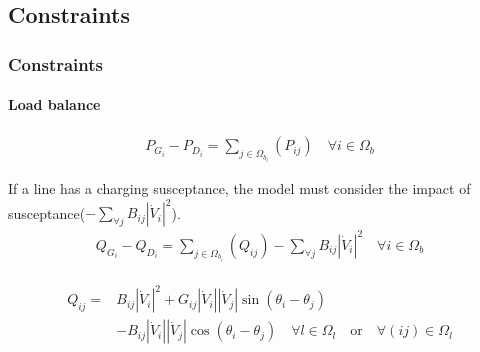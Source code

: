 \documentclass[
	11pt, %
	aspectratio=169, %
]{beamer}
\begin{document}

\subsection{Constraints}

\begin{frame}
	\frametitle{Constraints}
	\label{frame:constraints}
	\framesubtitle{Load balance} %

	\begin{align}
	\label{eq:cons_load_bal_P}
		P_{G_{i}} - P_{D_{i}} = \sum_{j \in \Omega_{b_{i}}}(P_{ij})  \quad \forall i \in \Omega_{b}
	\end{align}

	If a line has a charging susceptance, the model must consider the impact of susceptance($-\sum_{\forall j }B_{ij} \left\lvert \dot{V}_{i}\right\rvert^{2}$).
	\begin{align}
	\label{eq:cons_load_bal_Q}
		Q_{G_{i}} - Q_{D_{i}} = \sum_{j \in \Omega_{b_{i}}}(Q_{ij}) - \sum_{\forall j }B_{ij} \left\lvert \dot{V}_{i}\right\rvert^{2}  \quad \forall i \in \Omega_{b}
	\end{align}

	\begin{align}
	\label{eq:expr_q_flow_ij}
		\begin{split}
			Q_{ij}=&B_{ij}\left\lvert \dot{V}_{i}\right\rvert^{2} + G_{ij}\left\lvert \dot{V}_{i}\right\rvert\left\lvert \dot{V}_{j}\right\rvert \sin{\left(\theta_{i}-\theta_{j}\right)} \\
			&- B_{ij}\left\lvert \dot{V}_{i}\right\rvert\left\lvert \dot{V}_{j}\right\rvert \cos{\left(\theta_{i}-\theta_{j}\right)}  \quad   \forall l \in \Omega_{l} \quad \text{or} \quad \forall (ij) \in \Omega_{l}
		\end{split}
	\end{align}

	
\end{frame}

\end{document}
